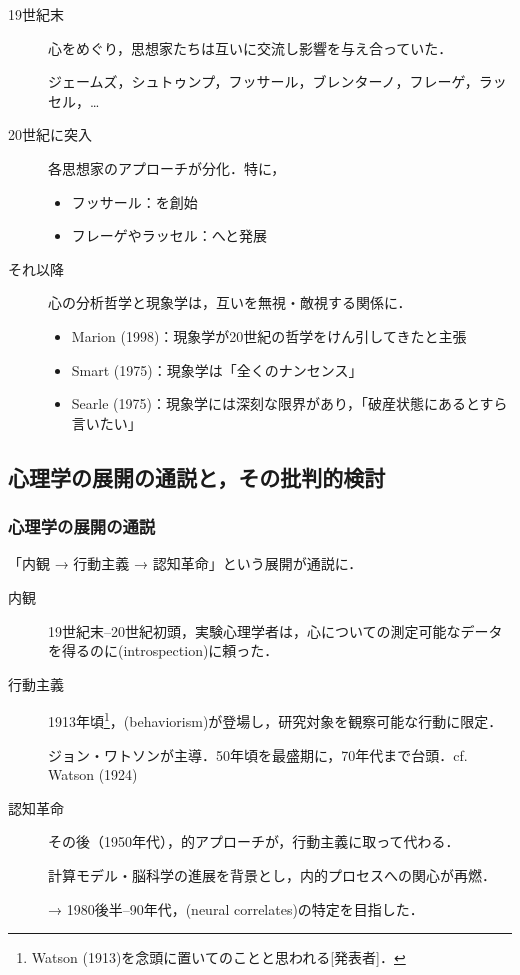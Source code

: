 \documentclass[b5j, 9pt]{ltjsarticle}
\begin{document}
\begin{description}
  \item[19世紀末] 心をめぐり，思想家たちは互いに交流し影響を与え合っていた．\par
  {\small ジェームズ，シュトゥンプ，フッサール，ブレンターノ，フレーゲ，ラッセル，…}
  \item[20世紀に突入] 各思想家のアプローチが分化．特に，
  \begin{itemize}
    \item フッサール：を創始
    \item フレーゲやラッセル：へと発展
  \end{itemize}
  \item[それ以降] 心の分析哲学と現象学は，互いを無視・敵視する関係に．
  \begin{itemize}
    \item Marion (1998)：現象学が20世紀の哲学をけん引してきたと主張
    \item Smart (1975)：現象学は「全くのナンセンス」
    \item Searle (1975)：現象学には深刻な限界があり，「破産状態にあるとすら言いたい」
  \end{itemize}
\end{description}


\subsection{心理学の展開の通説と，その批判的検討}

\subsubsection{心理学の展開の通説}

「内観 → 行動主義 → 認知革命」という展開が通説に．

\begin{description}
  \item[内観] 19世紀末--20世紀初頭，実験心理学者は，心についての測定可能なデータを得るのに(introspection)に頼った．
  \item[行動主義] 1913年頃\footnote{Watson (1913)を念頭に置いてのことと思われる[発表者]．}，(behaviorism)が登場し，研究対象を観察可能な行動に限定．\par
  ジョン・ワトソンが主導．50年頃を最盛期に，70年代まで台頭．cf. Watson (1924)
  \item[認知革命] その後（1950年代），的アプローチが，行動主義に取って代わる．\par
  計算モデル・脳科学の進展を背景とし，内的プロセスへの関心が再燃．\par
  {\small → 1980後半--90年代，(neural correlates)の特定を目指した．}
\end{description}
\end{document}
